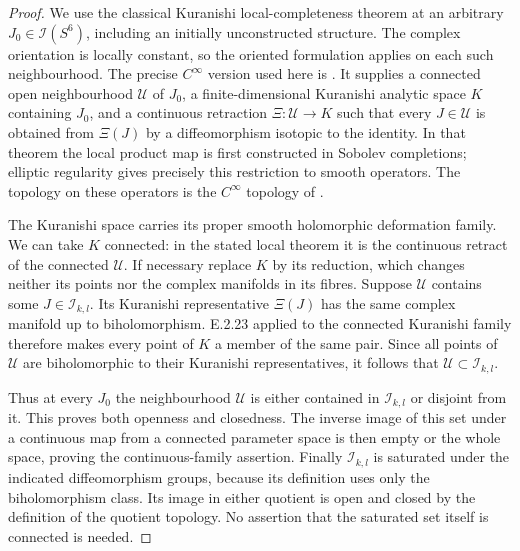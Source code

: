 \begin{proof}
We use the classical Kuranishi local-completeness
theorem at an arbitrary $J_0\in\mathcal I(S^6)$,
including an initially unconstructed structure.
The complex orientation is locally constant, so the
oriented formulation applies on each such neighbourhood.
The precise $C^\infty$ version used here is
\citet[Section~3.2, Theorem~3.4 and Remark~3.6,
pp.~898--899]{Meersseman2019E}.  It supplies a connected
open neighbourhood $\mathcal U$ of $J_0$, a
finite-dimensional Kuranishi analytic space $K$
containing $J_0$, and a continuous retraction
$\Xi:\mathcal U\to K$ such that every $J\in\mathcal U$
is obtained from $\Xi(J)$ by a diffeomorphism isotopic
to the identity.  In that theorem the local product
map is first constructed in Sobolev completions;
elliptic regularity gives precisely this restriction
to smooth operators.  The topology on these operators
is the $C^\infty$ topology of
\cite[Section~2.1, pp.~883--884]{Meersseman2019E}.

The Kuranishi space carries its proper smooth
holomorphic deformation family.  We can take $K$
connected: in the stated local theorem it is the
continuous retract of the connected $\mathcal U$.
If necessary replace $K$ by its reduction, which
changes neither its points nor the complex manifolds
in its fibres.  Suppose $\mathcal U$ contains some
$J\in\mathcal I_{k,l}$.  Its Kuranishi representative
$\Xi(J)$ has the same complex manifold up to
biholomorphism.  E.2.23 applied to the connected
Kuranishi family therefore makes every point of
$K$ a member of the same pair.  Since all points
of $\mathcal U$ are biholomorphic to their
Kuranishi representatives, it follows that
$\mathcal U\subset\mathcal I_{k,l}$.

Thus at every $J_0$ the neighbourhood $\mathcal U$
is either contained in $\mathcal I_{k,l}$ or
disjoint from it.  This proves both openness and
closedness.  The inverse image of this set under
a continuous map from a connected parameter space
is then empty or the whole space, proving the
continuous-family assertion.  Finally
$\mathcal I_{k,l}$ is saturated under the indicated
diffeomorphism groups, because its definition uses
only the biholomorphism class.  Its image in either
quotient is open and closed by the definition of
the quotient topology.  No assertion that the
saturated set itself is connected is needed.
\end{proof}
